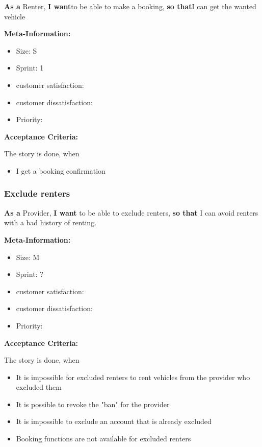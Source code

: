 \textbf{As a} Renter,\hfill\break
\textbf{I want}to be able to make a booking,\hfill\break
\textbf{so that}I can get the wanted vehicle

\textbf{Meta-Information:}
\begin{itemize}
    \item Size: S
    \item Sprint: 1
    \item customer satisfaction:
    \item customer dissatisfaction:
    \item Priority:
\end{itemize}

\textbf{Acceptance Criteria:}

The story is done, when
\begin{itemize}
    \item I get a booking confirmation
\end{itemize}

\subsubsection{Exclude renters}

\textbf{As a} Provider,\hfill\break
\textbf{I want} to be able to exclude renters,\hfill\break
\textbf{so that} I can avoid renters with a bad history of renting.

\textbf{Meta-Information:}
\begin{itemize}
    \item Size: M
    \item Sprint: ?
    \item customer satisfaction:
    \item customer dissatisfaction:
    \item Priority:
\end{itemize}

\textbf{Acceptance Criteria:}

The story is done, when
\begin{itemize}
    \item It is impossible for excluded renters to rent vehicles from the provider who excluded them
    \item It is possible to revoke the "ban" for the provider
    \item It is impossible to exclude an account that is already excluded
    \item Booking functions are not available for excluded renters
\end{itemize}

